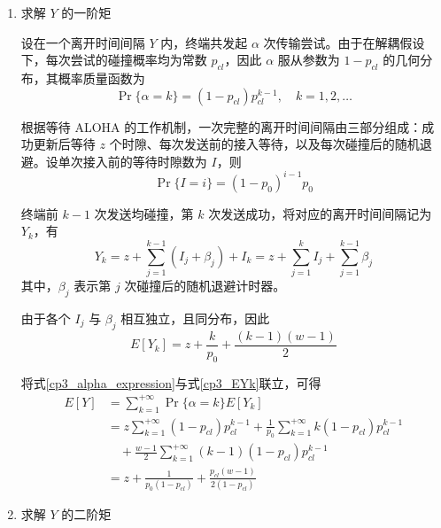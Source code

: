 \begin{enumerate}[wide]
    \item 求解 $Y$ 的一阶矩

    设在一个离开时间间隔 $Y$ 内，终端共发起 $\alpha$ 次传输尝试。由于在解耦假设下，每次尝试的碰撞概率均为常数 $p_{cl}$，因此 $\alpha$ 服从参数为 $1-p_{cl}$ 的几何分布，其概率质量函数为
    \begin{equation}\label{cp3_alpha_expression}
        \Pr\{\alpha=k\}=(1-p_{cl})p_{cl}^{k-1},\quad k=1,2,\dots
    \end{equation}

    根据等待 ALOHA 的工作机制，一次完整的离开时间间隔由三部分组成：成功更新后等待 $z$ 个时隙、每次发送前的接入等待，以及每次碰撞后的随机退避。设单次接入前的等待时隙数为 $I$，则
    \begin{equation}\label{cp3_I_expression}
        \Pr\{I=i\}=(1-p_0)^{i-1}p_0
    \end{equation}

    终端前 $k-1$ 次发送均碰撞，第 $k$ 次发送成功，将对应的离开时间间隔记为 $Y_k$，有
    \begin{equation}\label{cp3_Yk_expression}
        Y_k=z+\sum_{j=1}^{k-1}(I_j+\beta_j)+I_k
        =z+\sum_{j=1}^{k}I_j+\sum_{j=1}^{k-1}\beta_j
    \end{equation}
    其中，$\beta_j$ 表示第 $j$ 次碰撞后的随机退避计时器。

    由于各个 $I_j$ 与 $\beta_j$ 相互独立，且同分布，因此
    \begin{equation}\label{cp3_EYk}
        E[Y_k]=z+\frac{k}{p_0}+\frac{(k-1)(w-1)}{2}
    \end{equation}

    将式\eqref{cp3_alpha_expression}与式\eqref{cp3_EYk}联立，可得
    \begin{equation}\label{cp3_EY}
        \begin{split}
            E[Y] &= \sum_{k=1}^{+\infty}\Pr\{\alpha=k\}E[Y_k] \\
            &= z\sum_{k=1}^{+\infty}(1-p_{cl})p_{cl}^{k-1} + \frac{1}{p_0}\sum_{k=1}^{+\infty}k(1-p_{cl})p_{cl}^{k-1} \\
            &\quad + \frac{w-1}{2}\sum_{k=1}^{+\infty}(k-1)(1-p_{cl})p_{cl}^{k-1} \\
            &= z + \frac{1}{p_0(1-p_{cl})} + \frac{p_{cl}(w-1)}{2(1-p_{cl})}
        \end{split}
    \end{equation}

    \item 求解 $Y$ 的二阶矩


\end{enumerate}
